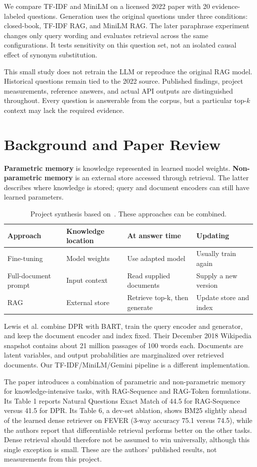 \documentclass[12pt,a4paper]{article}
\begin{document}
We compare TF-IDF and MiniLM on a licensed 2022 paper with 20 evidence-labeled questions. Generation uses the original questions under three conditions: closed-book, TF-IDF RAG, and MiniLM RAG. The later paraphrase experiment changes only query wording and evaluates retrieval across the same configurations. It tests sensitivity on this question set, not an isolated causal effect of synonym substitution.

This small study does not retrain the LLM or reproduce the original RAG model. Historical questions remain tied to the 2022 source. Published findings, project measurements, reference answers, and actual API outputs are distinguished throughout. Every question is answerable from the corpus, but a particular top-$k$ context may lack the required evidence.

\newpage
\section{Background and Paper Review}
\textbf{Parametric memory} is knowledge represented in learned model weights. \textbf{Non-parametric memory} is an external store accessed through retrieval. The latter describes where knowledge is stored; query and document encoders can still have learned parameters.
\begin{table}[H]\centering\small
\begin{tabularx}{\linewidth}{p{2.4cm}XXX}\toprule
Approach & Knowledge location & At answer time & Updating\\\midrule
Fine-tuning & Model weights & Use adapted model & Usually train again\\
Full-document prompt & Input context & Read supplied documents & Supply a new version\\
RAG & External store & Retrieve top-k, then generate & Update store and index\\\bottomrule
\end{tabularx}
\caption{Project synthesis based on~\cite{lewis}. These approaches can be combined.}
\end{table}
Lewis et al. combine DPR with BART, train the query encoder and generator, and keep the document encoder and index fixed. Their December 2018 Wikipedia snapshot contains about 21 million passages of 100 words each. Documents are latent variables, and output probabilities are marginalized over retrieved documents. Our TF-IDF/MiniLM/Gemini pipeline is a different implementation.

The paper introduces a combination of parametric and non-parametric memory for knowledge-intensive tasks, with RAG-Sequence and RAG-Token formulations. Its Table 1 reports Natural Questions Exact Match of 44.5 for RAG-Sequence versus 41.5 for DPR. Its Table 6, a dev-set ablation, shows BM25 slightly ahead of the learned dense retriever on FEVER (3-way accuracy 75.1 versus 74.5), while the authors report that differentiable retrieval performs better on the other tasks. Dense retrieval should therefore not be assumed to win universally, although this single exception is small. These are the authors' published results, not measurements from this project.
\end{document}

